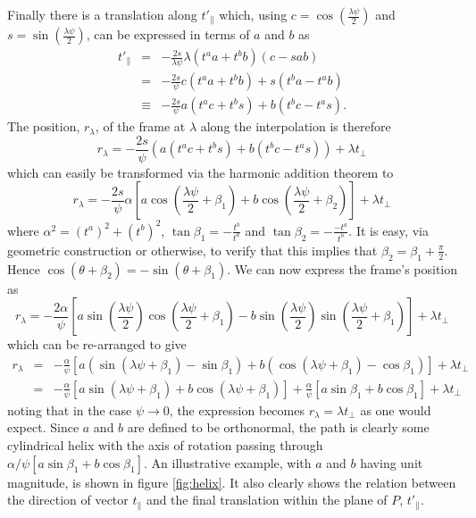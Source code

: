 Finally there is a translation along $t'_\parallel$ which, 
using $c = \cos\left(\frac{\lambda \psi}{2}\right)$ and $s = \sin\left(\frac{\lambda \psi}{2}\right)$,
can be expressed in terms of $a$ and $b$ as
\begin{eqnarray*}
t'_\parallel & = & - \frac{2s}{\lambda\psi} \lambda (t^a a + t^b b) (c - sab) \\
& = & -\frac{2s}{\psi} c (t^a a + t^b b) + s ( t^b a - t^a b) \\
& \equiv & -\frac{2s}{\psi} a (t^a c + t^b s) + b ( t^b c - t^a s).
\end{eqnarray*}
The position, $r_\lambda$, of the frame at $\lambda$ along the interpolation is therefore
\[
r_\lambda = -\frac{2s}{\psi} (a (t^a c + t^b s) + b ( t^b c - t^a s)) + \lambda t_\perp
\]
which can easily be transformed via the harmonic addition theorem to
\[
r_\lambda = -\frac{2s}{\psi} \alpha \left[ a \cos\left(\frac{\lambda\psi}{2} + \beta_1\right) + b \cos\left(\frac{\lambda\psi}{2} + \beta_2\right) \right] + \lambda t_\perp
\]
where $\alpha^2 = (t^a)^2 + (t^b)^2$, $\tan \beta_1 = - \frac{t^b}{t^a}$ and $\tan \beta_2 = - \frac{-t^a}{t^b}$. 
It is easy, via geometric construction or otherwise, to verify that this implies
that $\beta_2 = \beta_1 + \frac{\pi}{2}$. Hence $\cos(\theta + \beta_2) = - \sin(\theta + \beta_1)$. We can now express the frame's position as
\[
r_\lambda = -\frac{2\alpha}{\psi} \left[ a \sin\left(\frac{\lambda\psi}{2}\right)\cos\left(\frac{\lambda\psi}{2} + \beta_1\right) - b \sin\left(\frac{\lambda\psi}{2}\right)\sin\left(\frac{\lambda\psi}{2} + \beta_1\right) \right] + \lambda t_\perp
\]
which can be re-arranged to give
\begin{eqnarray*}
r_\lambda & = & -\frac{\alpha}{\psi} \left[ a \left(\sin\left(\lambda\psi + \beta_1\right) - \sin\beta_1\right)
+ b \left(\cos\left(\lambda\psi + \beta_1\right) - \cos\beta_1\right) \right] + \lambda t_\perp \\
& = & -\frac{\alpha}{\psi} \left[ a \sin\left(\lambda\psi + \beta_1\right)
+ b \cos\left(\lambda\psi + \beta_1\right) \right] + \frac{\alpha}{\psi} \left[
a \sin \beta_1 + b \cos \beta_1
\right] + \lambda t_\perp 
\end{eqnarray*}
noting that in the case $\psi \rightarrow 0$, the expression becomes $r_\lambda = \lambda t_\perp$ as one would
expect. Since $a$ and $b$ are defined to be orthonormal, the path is clearly some cylindrical helix with the axis of rotation passing through 
$\alpha/\psi  \left[ a \sin \beta_1 + b \cos \beta_1 \right]$.
An illustrative example, with $a$ and $b$ having
unit magnitude, is shown in figure \ref{fig:helix}. It also clearly shows the relation between the direction of
vector $t_\parallel$ and the final translation within the plane of $P$, $t'_\parallel$.

